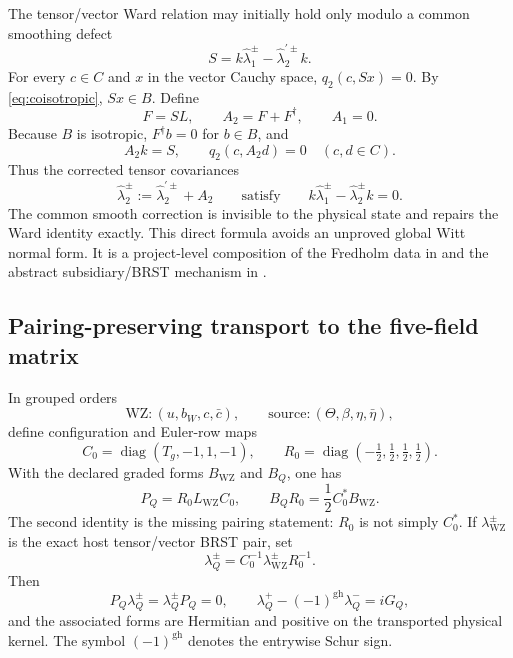 \documentclass[11pt]{article}
\theoremstyle{definition}
\theoremstyle{remark}
\newcommand{\cbar}{\bar c}
\newcommand{\gh}{\operatorname{gh}}
\begin{document}
The tensor/vector Ward relation may initially hold only modulo a common smoothing
defect
\begin{equation}
 S=k\widehat\lambda_1^\pm-\widehat\lambda_2^{\prime\pm}k.
\end{equation}
For every $c\in C$ and $x$ in the vector Cauchy space, $q_2(c,Sx)=0$.  By
\cref{eq:coisotropic}, $Sx\in B$.  Define
\begin{equation}
 F=SL,
 \qquad A_2=F+F^\dagger,
 \qquad A_1=0.
 \label{eq:wardcorrection}
\end{equation}
Because $B$ is isotropic, $F^\dagger b=0$ for $b\in B$, and
\begin{equation}
 A_2k=S,
 \qquad q_2(c,A_2d)=0\quad(c,d\in C).
\end{equation}
Thus the corrected tensor covariances
\begin{equation}
 \widehat\lambda_2^\pm:=\widehat\lambda_2^{\prime\pm}+A_2
 \qquad\text{satisfy}\qquad
 k\widehat\lambda_1^\pm-\widehat\lambda_2^\pm k=0.
\end{equation}
The common smooth correction is invisible to the physical state and repairs the Ward
identity exactly.  This direct formula avoids an unproved global Witt normal
form.  It is a project-level composition of the Fredholm data in \cite{Gerard2023}
and the abstract subsidiary/BRST mechanism in
\cite{GerardWrochna2017,WrochnaZahn2015}.

\subsection{Pairing-preserving transport to the five-field matrix}

In grouped orders
\begin{equation}
 \text{WZ}: (u,b_W,c,\cbar),
 \qquad
 \text{source}: (\Theta,\beta,\eta,\bar\eta),
\end{equation}
define configuration and Euler-row maps
\begin{equation}
 C_0=\operatorname{diag}(T_g,-1,1,-1),
 \qquad
 R_0=\operatorname{diag}(-\tfrac12,\tfrac12,\tfrac12,\tfrac12).
 \label{eq:CRmaps}
\end{equation}
With the declared graded forms $B_{\mathrm{WZ}}$ and $B_Q$, one has
\begin{equation}
 P_Q=R_0L_{\mathrm{WZ}}C_0,
 \qquad
 B_QR_0=\frac12C_0^*B_{\mathrm{WZ}}.
 \label{eq:pairduality}
\end{equation}
The second identity is the missing pairing statement: $R_0$ is not simply
$C_0^*$.  If $\lambda_{\mathrm{WZ}}^\pm$ is the exact host tensor/vector BRST pair,
set
\begin{equation}
 \lambda_Q^\pm=C_0^{-1}\lambda_{\mathrm{WZ}}^\pm R_0^{-1}.
 \label{eq:covtransport}
\end{equation}
Then
\begin{equation}
 P_Q\lambda_Q^\pm=\lambda_Q^\pm P_Q=0,
 \qquad
 \lambda_Q^+-(-1)^{\gh}\lambda_Q^-=iG_Q,
 \label{eq:q2ids}
\end{equation}
and the associated forms are Hermitian and positive on the transported physical
kernel.  The symbol $(-1)^{\gh}$ denotes the entrywise Schur sign.
\end{document}
